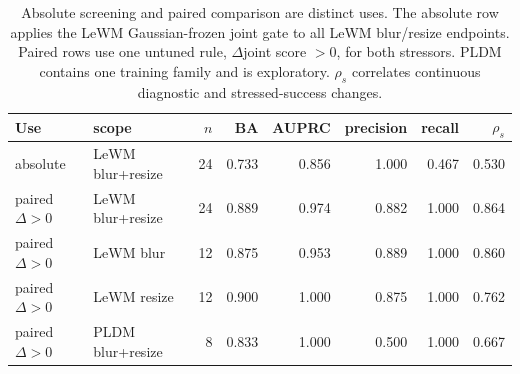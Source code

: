\begin{table}[H]
\centering
\caption{Absolute screening and paired comparison are distinct uses. The absolute row applies the LeWM Gaussian-frozen joint gate to all LeWM blur/resize endpoints. Paired rows use one untuned rule, $\Delta$joint score $>0$, for both stressors. PLDM contains one training family and is exploratory. $\rho_s$ correlates continuous diagnostic and stressed-success changes.}
\label{tab:cross-stressor-paired-change}
\scriptsize
\setlength{\tabcolsep}{2.5pt}
\begin{tabular}{llrrrrrr}
\toprule
Use & scope & $n$ & BA & AUPRC & precision & recall & $\rho_s$ \\
\midrule
absolute & LeWM blur+resize & 24 & 0.733 & 0.856 & 1.000 & 0.467 & 0.530 \\
\midrule
paired $\Delta>0$ & LeWM blur+resize & 24 & 0.889 & 0.974 & 0.882 & 1.000 & 0.864 \\
paired $\Delta>0$ & LeWM blur & 12 & 0.875 & 0.953 & 0.889 & 1.000 & 0.860 \\
paired $\Delta>0$ & LeWM resize & 12 & 0.900 & 1.000 & 0.875 & 1.000 & 0.762 \\
paired $\Delta>0$ & PLDM blur+resize & 8 & 0.833 & 1.000 & 0.500 & 1.000 & 0.667 \\
\bottomrule
\end{tabular}
\end{table}
